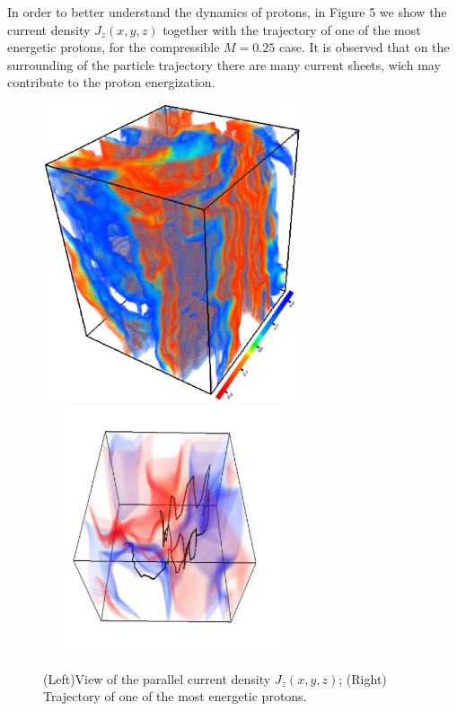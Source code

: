 \documentclass[%
aip,pop,amsmath,amssymb,
 reprint,%
]{revtex4-1}
\begin{document}
In order to better understand the dynamics of protons, in Figure
5 we show the current density $J_z(x,y,z)$ together
with the trajectory of one of the most energetic protons,
for the compressible $M=0.25$ case.
It is observed that on the surrounding of the particle trajectory 
there are many current sheets, wich
may contribute to the proton energization.

\begin{figure}[h!]
\begin{center}
{\includegraphics[width = 3in]{./Figures/Fig5_a}}
{\includegraphics[height=2.87in, width = 3in]{./Figures/Fig5_b}}
\caption{(Left)View of the parallel current density $J_z(x,y,z)$;
(Right) Trajectory of one of the most energetic protons.}
\end{center}
\label{mean square velocity}
\end{figure}
\end{document}
